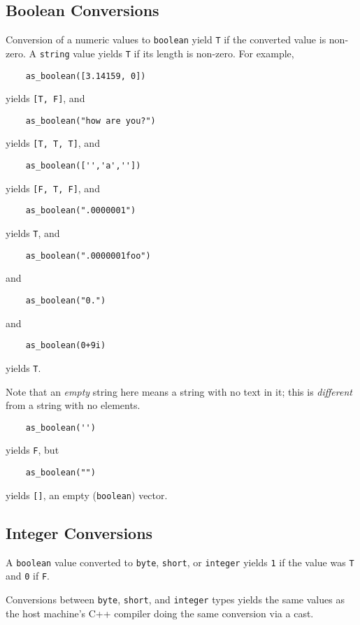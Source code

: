 \subsection{Boolean Conversions}

Conversion of a numeric values to {\tt boolean} yield {\tt T} if the converted value is
non-zero.  A {\tt string} value yields {\tt T} if its length is non-zero. For example,
\begin{verbatim}
    as_boolean([3.14159, 0])
\end{verbatim}
yields {\tt [T, F]}, and
\begin{verbatim}
    as_boolean("how are you?")
\end{verbatim}
yields {\tt [T, T, T]}, and
\begin{verbatim}
    as_boolean(['','a',''])
\end{verbatim}
yields {\tt [F, T, F]}, and
\begin{verbatim}
    as_boolean(".0000001")
\end{verbatim}
yields {\tt T}, and
\begin{verbatim}
    as_boolean(".0000001foo")
\end{verbatim}
and
\begin{verbatim}
    as_boolean("0.")
\end{verbatim}
and
\begin{verbatim}
    as_boolean(0+9i)
\end{verbatim}
yields {\tt T}.

Note that an {\em empty} string here means
a string with no text in it; this is {\em different} from a string
with no elements.
\begin{verbatim}
    as_boolean('')
\end{verbatim}
yields {\tt F}, but
\begin{verbatim}
    as_boolean("")
\end{verbatim}
yields {\tt []}, an empty ({\tt boolean}) vector.

\subsection{Integer Conversions}
\label{integer-conversion}
A {\tt boolean} value converted to {\tt byte}, {\tt short}, or {\tt integer}
yields {\tt 1} if the value was {\tt T} and {\tt 0} if {\tt F}.

Conversions between {\tt byte}, {\tt short}, and {\tt integer} types
yields the same values as the host machine's C++ compiler doing
the same conversion via a cast.

